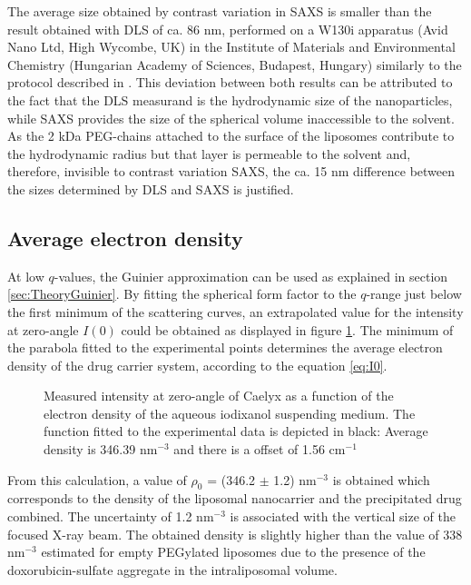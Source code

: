 The average size obtained by contrast variation in SAXS is smaller than the result obtained with DLS of ca. 86 nm, performed on a W130i apparatus (Avid Nano Ltd, High Wycombe, UK) in the Institute of Materials and Environmental Chemistry (Hungarian Academy of Sciences, Budapest, Hungary) similarly to the protocol described in \cite{varga_osmotic_2014}. This deviation between both results can be attributed to the fact that the DLS measurand is the hydrodynamic size of the nanoparticles, while SAXS provides the size of the spherical volume inaccessible to the solvent. As the 2 kDa PEG-chains attached to the surface of the liposomes contribute to the hydrodynamic radius but that layer is permeable to the solvent and, therefore, invisible to contrast variation SAXS, the ca. 15 nm difference between the sizes determined by DLS and SAXS is justified. 

\subsection{Average electron density}
At low $q$-values, the Guinier approximation can be used as explained in section \ref{sec:TheoryGuinier}. By fitting the spherical form factor to the $q$-range just below the first minimum of the scattering curves, an extrapolated value for the intensity at zero-angle $I(0)$ could be obtained as displayed in figure \ref{fig:CaelyxAverageDensity}. The minimum of the parabola fitted to the experimental points determines the average electron density of the drug carrier system, according to the equation \ref{eq:I0}.

\begin{figure}
	\centering
		
		\caption[Zero-angle intensity of Caelyx.]{Measured intensity at zero-angle of Caelyx as a function of the electron density of the aqueous iodixanol suspending medium. The function fitted to the experimental data is depicted in black: Average density is 346.39 nm$^{-3}$ and there is a offset of 1.56 cm$^{-1}$}
		\label{fig:CaelyxAverageDensity}
\end{figure}

From this calculation, a value of $\rho_0$ = (346.2 $\pm$ 1.2) nm$^{-3}$ is obtained which corresponds to the density of the liposomal nanocarrier and the precipitated drug combined. The uncertainty of 1.2 nm$^{-3}$ is associated with the vertical size of the focused X-ray beam. The obtained density is slightly higher than the value of 338 nm$^{-3}$ estimated for empty PEGylated liposomes \citep{kucerka_structure_2006} due to the presence of the doxorubicin-sulfate aggregate in the intraliposomal volume.

